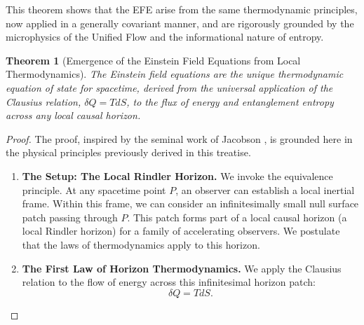 \documentclass[11pt, letterpaper]{report}
\theoremstyle{plain} %
\newtheorem{theorem}{Theorem}[chapter]
\theoremstyle{definition} %
\theoremstyle{remark} %
\begin{document}
This theorem shows that the EFE arise from the same thermodynamic principles, now applied in a generally covariant manner, and are rigorously grounded by the microphysics of the Unified Flow and the informational nature of entropy.

\begin{theorem}[Emergence of the Einstein Field Equations from Local Thermodynamics]
\label{thm:verify_efe_revised}
The Einstein field equations are the unique thermodynamic equation of state for spacetime, derived from the universal application of the Clausius relation, $\delta Q = T dS$, to the flux of energy and entanglement entropy across any local causal horizon.
\end{theorem}
\begin{proof}
The proof, inspired by the seminal work of Jacobson \cite{Jacobson1995Thermodynamics}, is grounded here in the physical principles previously derived in this treatise.
\begin{enumerate}
    \item \textbf{The Setup: The Local Rindler Horizon.} We invoke the equivalence principle. At any spacetime point $P$, an observer can establish a local inertial frame. Within this frame, we can consider an infinitesimally small null surface patch passing through $P$. This patch forms part of a local causal horizon (a local Rindler horizon) for a family of accelerating observers. We postulate that the laws of thermodynamics apply to this horizon.

    \item \textbf{The First Law of Horizon Thermodynamics.} We apply the Clausius relation to the flow of energy across this infinitesimal horizon patch:
    \begin{equation}
        \delta Q = T dS.
    \end{equation}


\end{enumerate}
\end{proof}
\end{document}
